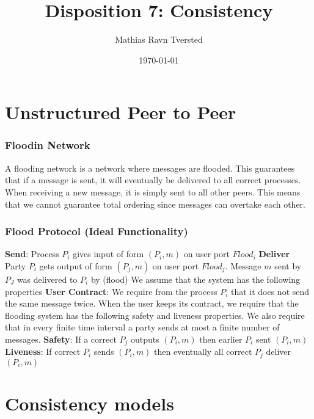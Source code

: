\documentclass[14pt]{beamer}
\title{Disposition 7: Consistency}
\author{Mathias Ravn Tversted}
\date{\today}
\begin{document}
\frame{\titlepage} 








\section{Unstructured Peer to Peer}
    \begin{frame}
        \frametitle{Floodin Network}
            A flooding network is a network where messages are flooded. This guarantees that if a message is sent, it will eventually be delivered to all correct processes. When receiving a new message, it is simply sent to all other peers. This means that we cannot guarantee total ordering since messages can overtake each other. 
    \end{frame}
    \begin{frame}
        \frametitle{Flood Protocol (Ideal Functionality)}
            \textbf{Send}: Process $P_i$ gives input of form $(P_i, m)$ on user port $Flood_i$
            \textbf{Deliver} Party $P_i$ gets output of form $(P_j, m)$ on user port $Flood_j$. Message $m$ sent by $P_J$ was delivered to $P_i$ by (flood)
            We assume that the system has the following properties
            \textbf{User Contract}: We require from the process $P_i$ that it does not send the same message twice. When the user keeps its contract, we require that the flooding system has the following safety and liveness properties. We also require that in every finite time interval a party sends at most a finite number of messages.
            \textbf{Safety}: If a correct $P_j$ outputs $(P_i, m)$ then earlier $P_i$ sent $(P_i, m)$
            \textbf{Liveness}: If correct $P_i$ sends $(P_i, m)$ then eventually all correct $P_j$ deliver $(P_i, m)$
    \end{frame}

\section{Consistency models}
\end{document}
